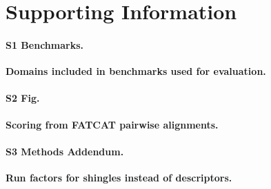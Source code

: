 \documentclass[10pt,letterpaper]{article}
\begin{document}
\section*{Supporting Information}

\paragraph*{S1 Benchmarks.}
\label{S1_Benchmarks}
{\bf Domains included in benchmarks used for evaluation.} 

\paragraph*{S2 Fig.}
\label{S2_Fig}
{\bf Scoring from FATCAT pairwise alignments.} 

\paragraph*{S3 Methods Addendum.}
\label{S3_Methods}
{\bf Run factors for shingles instead of descriptors.} 


\nolinenumbers

%
%
% 

\nocite{Ayoub2017}
\nocite{BioJava2012}

\end{document}
